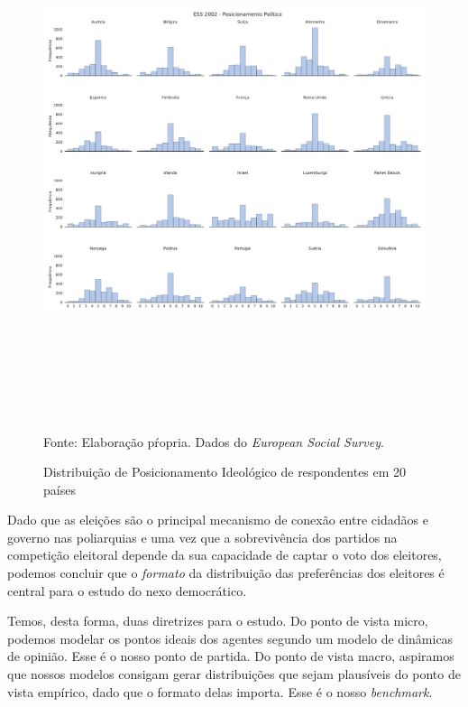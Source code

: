 \begin{figure}[H]
  \centering \includegraphics[width= \textwidth, height = 15cm]{ims/ess_2002_plots.pdf}
  \caption{Distribuição de Posicionamento Ideológico de respondentes em 20 países}
  Fonte: Elaboração pŕopria. Dados do \textit{European Social Survey}.
\end{figure}

Dado que as eleições são o principal mecanismo de conexão entre cidadãos e
governo nas poliarquias \cite{dahl1989democracy} e uma vez que a sobrevivência
dos partidos na competição eleitoral depende da sua capacidade de captar o voto
dos eleitores, podemos concluir que o \textit{formato} da distribuição das
preferências dos eleitores é central para o estudo do nexo democrático.

Temos, desta forma, duas diretrizes para o estudo. Do ponto de vista micro,
podemos modelar os pontos ideais dos agentes segundo um modelo de dinâmicas de
opinião. Esse é o nosso ponto de partida. Do ponto de vista macro, aspiramos que
nossos modelos consigam gerar distribuições que sejam plausíveis do ponto de
vista empírico, dado que o formato delas importa. Esse é o nosso
\textit{benchmark}.



